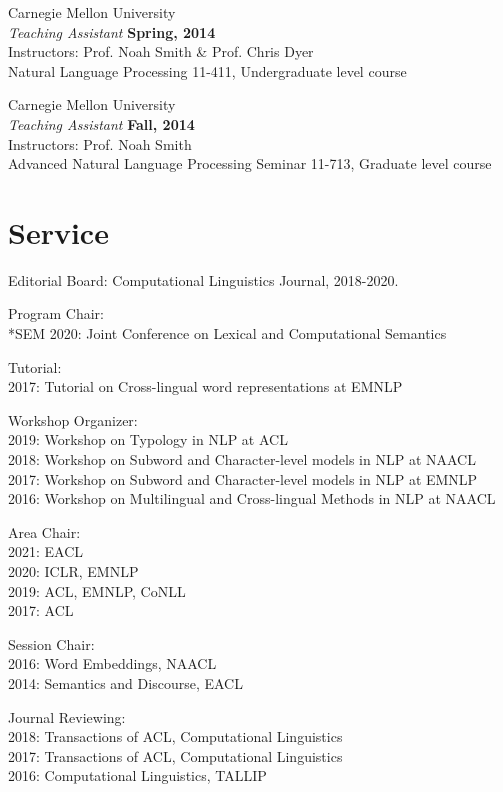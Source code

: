 \documentclass[margin,line]{res}
\begin{document}
\begin{resume}
{Carnegie Mellon University} \\
{\em Teaching Assistant} \hfill {\bf Spring, 2014}\\
Instructors: Prof. Noah Smith \& Prof. Chris Dyer\\
Natural Language Processing 11-411, Undergraduate level course

{Carnegie Mellon University}\\
{\em Teaching Assistant} \hfill {\bf Fall, 2014}\\
Instructors: Prof. Noah Smith\\
Advanced Natural Language Processing Seminar 11-713, Graduate level course


\section{\sc Service}
\begin{hangparas}{.25in}{1}

Editorial Board: Computational Linguistics Journal, 2018-2020.

Program Chair:\\
*SEM 2020: Joint Conference on Lexical and Computational Semantics

Tutorial:\\
2017: Tutorial on Cross-lingual word representations at EMNLP

Workshop Organizer:\\
2019: Workshop on Typology in NLP at ACL\\
2018: Workshop on Subword and Character-level models in NLP at NAACL\\
2017: Workshop on Subword and Character-level models in NLP at EMNLP\\
2016: Workshop on Multilingual and Cross-lingual Methods in NLP at NAACL

Area Chair:\\
2021: EACL\\
2020: ICLR, EMNLP\\
2019: ACL, EMNLP, CoNLL\\
2017: ACL

Session Chair:\\
2016: Word Embeddings, NAACL\\
2014: Semantics and Discourse, EACL

Journal Reviewing: \\
2018: Transactions of ACL, Computational Linguistics\\
2017: Transactions of ACL, Computational Linguistics\\
2016: Computational Linguistics, TALLIP


\end{hangparas}
\end{resume}
\end{document}
